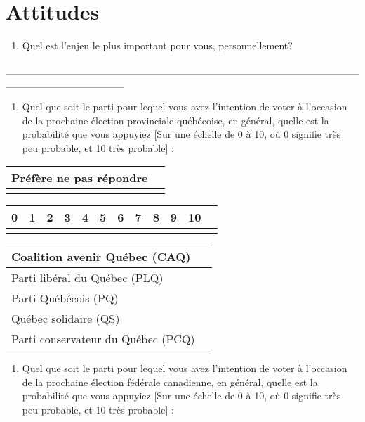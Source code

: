 \documentclass[
  letterpaper,
  DIV=11,
  numbers=noendperiod]{scrreprt}
\providecommand{\tightlist}{%
  \setlength{\itemsep}{0pt}\setlength{\parskip}{0pt}}\usepackage{longtable,booktabs,array}
\begin{document}
\hypertarget{attitudes}{%
\section{Attitudes}\label{attitudes}}

\begin{enumerate}
\def\labelenumi{\arabic{enumi}.}
\setcounter{enumi}{15}
\tightlist
\item
  Quel est l'enjeu le plus important pour vous, personnellement?
\end{enumerate}

\_\_\_\_\_\_\_\_\_\_\_\_\_\_\_\_\_\_\_\_\_\_\_\_\_\_\_\_\_\_\_\_\_\_\_\_\_\_\_\_\_\_\_\_\_\_\_\_\_\_\_\_\_\_\_\_\_\_\_\_\_\_\_\_

\begin{enumerate}
\def\labelenumi{\arabic{enumi}.}
\setcounter{enumi}{16}
\tightlist
\item
  Quel que soit le parti pour lequel vous avez l'intention de voter à
  l'occasion de la prochaine élection provinciale québécoise, en
  général, quelle est la probabilité que vous appuyiez {[}Sur une
  échelle de 0 à 10, où 0 signifie très peu probable, et 10 très
  probable{]} :
\end{enumerate}

\begin{longtable}[]{@{}ll@{}}
\toprule\noalign{}
Préfère ne pas répondre & \\
\midrule\noalign{}
\endhead
\bottomrule\noalign{}
\endlastfoot
\end{longtable}

\begin{longtable}[]{@{}llllllllllll@{}}
\toprule\noalign{}
0 & 1 & 2 & 3 & 4 & 5 & 6 & 7 & 8 & 9 & 10 & \\
\midrule\noalign{}
\endhead
\bottomrule\noalign{}
\endlastfoot
\end{longtable}

\begin{longtable}[]{@{}ll@{}}
\toprule\noalign{}
Coalition avenir Québec (CAQ) & \\
\midrule\noalign{}
\endhead
\bottomrule\noalign{}
\endlastfoot
Parti libéral du Québec (PLQ) & \\
Parti Québécois (PQ) & \\
Québec solidaire (QS) & \\
Parti conservateur du Québec (PCQ) & \\
\end{longtable}

\begin{enumerate}
\def\labelenumi{\arabic{enumi}.}
\setcounter{enumi}{17}
\tightlist
\item
  Quel que soit le parti pour lequel vous avez l'intention de voter à
  l'occasion de la prochaine élection fédérale canadienne, en général,
  quelle est la probabilité que vous appuyiez {[}Sur une échelle de 0 à
  10, où 0 signifie très peu probable, et 10 très probable{]} :
\end{enumerate}
\end{document}
